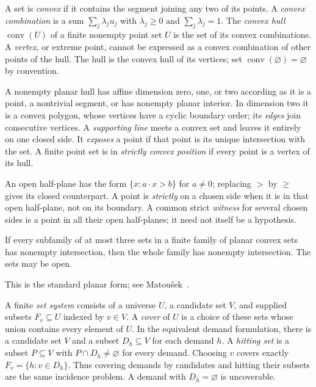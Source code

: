 \begin{definition}\label{def:convex-geometry}
A set is \emph{convex} if it contains the segment joining any two
of its points. A \emph{convex combination} is a sum
$\sum_j\lambda_j u_j$ with $\lambda_j\ge0$ and
$\sum_j\lambda_j=1$. The \emph{convex hull}
$\operatorname{conv}(U)$ of a finite nonempty point set $U$ is the set of
its convex combinations. A \emph{vertex}, or extreme point, cannot
be expressed as a convex combination of other points of the hull.
The hull is the convex hull of its vertices; set
$\operatorname{conv}(\varnothing)=\varnothing$ by convention.

A nonempty planar hull has affine dimension zero, one, or two according
as it is a point, a nontrivial segment, or has nonempty planar
interior. In dimension two it is a convex polygon, whose vertices
have a cyclic boundary order; its \emph{edges} join consecutive
vertices. A \emph{supporting line} meets a convex set and leaves
it entirely on one closed side. It \emph{exposes} a point if that
point is its unique intersection with the set. A finite point
set is in \emph{strictly convex position} if every point is a
vertex of its hull.
\end{definition}

An open half-plane has the form $\{x:a\cdot x>b\}$ for $a\ne0$;
replacing $>$ by $\ge$ gives its closed counterpart. A point is
\emph{strictly} on a chosen side when it is in that open half-plane,
not on its boundary. A common strict \emph{witness} for several
chosen sides is a point in all their open half-planes; it need
not itself be a hypothesis.

\begin{theorem}\label{thm:helly}
If every subfamily of at most three
sets in a finite family of planar convex sets has nonempty
intersection, then the whole family has nonempty intersection.
The sets may be open.
\end{theorem}
This is the standard planar form; see Matou\v{s}ek~\cite{matousek2002}.

\begin{definition}\label{def:covers-and-hitting}
A finite \emph{set system} consists of a universe $U$, a candidate
set $V$, and supplied subsets $F_v\subseteq U$ indexed by $v\in V$.
A \emph{cover} of $U$ is a choice of these sets whose union contains
every element of $U$.
In the equivalent demand formulation, there is a candidate set $V$
and a subset $D_h\subseteq V$ for each demand $h$. A \emph{hitting
set} is a subset $P\subseteq V$ with $P\cap D_h\ne\varnothing$
for every demand. Choosing $v$ covers exactly
$F_v=\{h:v\in D_h\}$. Thus covering demands by candidates and
hitting their subsets are the same incidence problem.
A demand with $D_h=\varnothing$ is uncoverable.
\end{definition}

